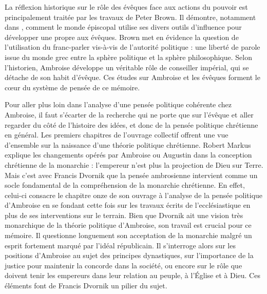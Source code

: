 \bigskip

La réflexion historique sur le rôle des évêques face aux actions du pouvoir est principale\-ment traitée par les travaux de Peter Brown. Il démontre, notamment dans \autocite{brown_power_1992}, comment le monde épiscopal utilise ses divers outils d'influence pour développer une  propre aux évêques. Brown met en évidence la question de l'utilisation du franc-parler vis-à-vis de l'autorité politique : une liberté de parole issue du monde grec entre la sphère politique et la sphère philosophique. Selon l'historien, Ambroise développe un véritable rôle de conseiller impérial, qui se détache de son habit d'évêque. Ces études sur Ambroise et les évêques forment le cœur du système de pensée de ce mémoire.

\bigskip

Pour aller plus loin dans l’analyse d’une pensée politique cohérente chez Ambroise, il faut s’écarter de la recherche qui ne porte que sur l’évêque et aller regarder du côté de l'histoire des idées, et donc de la pensée politique chrétienne en général. Les premiers chapitres de l'ouvrage collectif  offrent une vue d'ensemble sur la naissance d'une théorie politique chrétienne. Robert Markus explique les changements opérés par Ambroise ou Augustin dans la conception chrétienne de la monarchie : l'empereur n'est plus la projection de Dieu sur Terre\autocite{markus_peres_1993}. Mais c'est avec Francis Dvornik que la pensée ambrosienne intervient comme un socle fondamental de la compréhension de la monarchie chrétienne\autocite{dvornik_political}. En effet, celui-ci consacre le chapitre onze de son ouvrage à l'analyse de la pensée politique d’Ambroise en se fondant cette fois sur les travaux écrits de l'ecclésiastique en plus de ses interventions sur le terrain\autocite[672]{dvornik_political}. Bien que Dvornik ait une vision très monarchique de la théorie politique d'Ambroise, son travail est crucial pour ce mémoire. Il questionne longuement son acceptation de la monarchie malgré un esprit fortement marqué par l'idéal républicain\autocite[675]{dvornik_political}. Il s'interroge alors sur les positions d’Ambroise au sujet des principes dynastiques, sur l’importance de la justice pour maintenir la concorde dans la société, ou encore sur le rôle que doivent tenir les empereurs dans leur relation au peuple, à l'Église et à Dieu\autocite[672-682]{dvornik_political}. Ces éléments font de Francis Dvornik un pilier du sujet.

